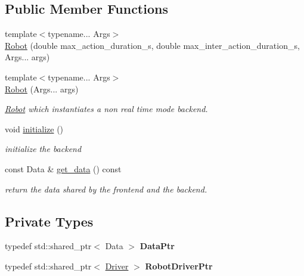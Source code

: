 \subsection*{Public Member Functions}
\begin{DoxyCompactItemize}
\item 
{\footnotesize template$<$typename... Args$>$ }\\\hyperlink{classrobot__interfaces_1_1Robot_ad91be1a022f648a691de55202f58543e}{Robot} (double max\+\_\+action\+\_\+duration\+\_\+s, double max\+\_\+inter\+\_\+action\+\_\+duration\+\_\+s, Args... args)
\item 
{\footnotesize template$<$typename... Args$>$ }\\\hyperlink{classrobot__interfaces_1_1Robot_a2db649f1bb6951f30111e0d35b760407}{Robot} (Args... args)
\begin{DoxyCompactList}\small\item\em \hyperlink{classrobot__interfaces_1_1Robot}{Robot} which instantiates a non real time mode backend. \end{DoxyCompactList}\item 
\mbox{\label{classrobot__interfaces_1_1Robot_af2d47a88a06f94e90bc0145ba1171cd0}} 
void \hyperlink{classrobot__interfaces_1_1Robot_af2d47a88a06f94e90bc0145ba1171cd0}{initialize} ()
\begin{DoxyCompactList}\small\item\em initialize the backend \end{DoxyCompactList}\item 
\mbox{\label{classrobot__interfaces_1_1Robot_af6e817bb62ff3d22ce1a9353709818c3}} 
const Data \& \hyperlink{classrobot__interfaces_1_1Robot_af6e817bb62ff3d22ce1a9353709818c3}{get\+\_\+data} () const
\begin{DoxyCompactList}\small\item\em return the data shared by the frontend and the backend. \end{DoxyCompactList}\end{DoxyCompactItemize}
\subsection*{Private Types}
\begin{DoxyCompactItemize}
\item 
\mbox{\label{classrobot__interfaces_1_1Robot_aae6cdfcef2853a056a6f7d7d2356b7df}} 
typedef std\+::shared\+\_\+ptr$<$ Data $>$ {\bfseries Data\+Ptr}
\item 
\mbox{\label{classrobot__interfaces_1_1Robot_a8aa32d96551cdd9234288203b1790f6d}} 
typedef std\+::shared\+\_\+ptr$<$ \hyperlink{classDriver}{Driver} $>$ {\bfseries Robot\+Driver\+Ptr}
\end{DoxyCompactItemize}
